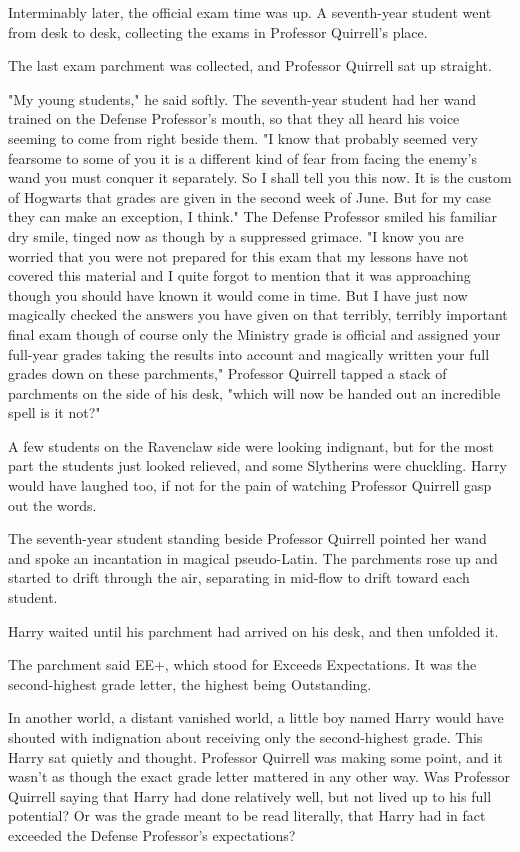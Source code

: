 Interminably later, the official exam time was up. A seventh-year student went
from desk to desk, collecting the exams in Professor Quirrell's place.

The last exam parchment was collected, and Professor Quirrell sat up straight.

"My young students," he said softly. The seventh-year student had her wand
trained on the Defense Professor's mouth, so that they all heard his voice
seeming to come from right beside them. "I know{\el} that probably seemed
very fearsome to some of you{\el} it is a different kind of fear from facing
the enemy's wand{\el} you must conquer it separately. So I{\el} shall
tell you this now. It is the custom of Hogwarts{\el} that grades are given
in the second week of June. But for my case{\el} they can make an exception,
I think." The Defense Professor smiled his familiar dry smile, tinged now as
though by a suppressed grimace. "I know you are worried{\el} that you were
not prepared for this exam{\el} that my lessons have not covered this
material{\el} and I quite forgot to mention{\el} that it was
approaching{\el} though you should have known{\el} it would come in time.
But I have just now magically checked{\el} the answers you have given on
that{\el} terribly, terribly important final exam{\el} though of course
only the Ministry grade is official{\el} and assigned your full-year grades
taking the results into account{\el} and magically written your full grades
down on these parchments," Professor Quirrell tapped a stack of parchments on
the side of his desk, "which will now be handed out{\el} an incredible
spell{\el} is it not?"

A few students on the Ravenclaw side were looking indignant, but for the most
part the students just looked relieved, and some Slytherins were chuckling.
Harry would have laughed too, if not for the pain of watching Professor
Quirrell gasp out the words.

The seventh-year student standing beside Professor Quirrell pointed her wand
and spoke an incantation in magical pseudo-Latin. The parchments rose up and
started to drift through the air, separating in mid-flow to drift toward each
student.

Harry waited until his parchment had arrived on his desk, and then unfolded it.

The parchment said EE+, which stood for Exceeds Expectations. It was the
second-highest grade letter, the highest being Outstanding.

In another world, a distant vanished world, a little boy named Harry would have
shouted with indignation about receiving only the second-highest grade. This
Harry sat quietly and thought. Professor Quirrell was making some point, and it
wasn't as though the exact grade letter mattered in any other way. Was
Professor Quirrell saying that Harry had done relatively well, but not lived up
to his full potential? Or was the grade meant to be read literally, that Harry
had in fact exceeded the Defense Professor's expectations?

